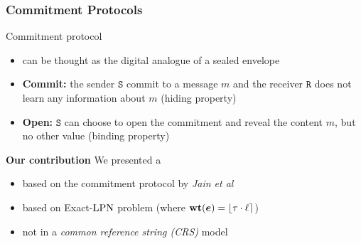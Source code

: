 \begin{frame}
\frametitle{Commitment Protocols}
\begin{block}{Commitment protocol}
 \begin{itemize}
  \item can be thought as the digital analogue of a sealed envelope
  \item \textbf{Commit: } the sender $\mathtt{S}$ commit to a message $m$ and the receiver $\mathtt{R}$ does not learn any information about $m$ (\alert{hiding} property)
  \item \textbf{Open: } $\mathtt{S}$ can choose to open the commitment and reveal the content $m$, but no other value (\alert{binding} property)
 \end{itemize}
\end{block}


\begin{block}{\textbf{Our contribution}}
 We presented a {\color{red}{Commitment protocol}}
 \begin{itemize}
  \item based on the commitment protocol by \textit{Jain et al}
  \item based on Exact-$\mathrm{LPN}$ problem (where $\mathbf{wt}(\boldsymbol{e})=\lfloor \tau \cdot \ell \rceil$)
  \item not in a \emph{common reference string (CRS)} model
 \end{itemize}
\end{block}


\end{frame}




